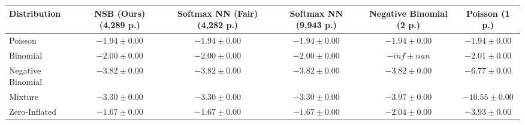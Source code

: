\begin{tabular}{lccccc}
\toprule
Distribution & NSB (Ours) (4,289 p.) & Softmax NN (Fair) (4,282 p.) & Softmax NN (9,943 p.) & Negative Binomial (2 p.) & Poisson (1 p.) \\
\midrule
Poisson & $-1.94 \pm 0.00$ & $-1.94 \pm 0.00$ & $-1.94 \pm 0.00$ & \textbf{$-1.94 \pm 0.00$} & $-1.94 \pm 0.00$ \\
Binomial & \textbf{$-2.00 \pm 0.00$} & $-2.00 \pm 0.00$ & $-2.00 \pm 0.00$ & $-inf \pm nan$ & $-2.01 \pm 0.00$ \\
Negative Binomial & $-3.82 \pm 0.00$ & $-3.82 \pm 0.00$ & $-3.82 \pm 0.00$ & \textbf{$-3.82 \pm 0.00$} & $-6.77 \pm 0.00$ \\
Mixture & $-3.30 \pm 0.00$ & \textbf{$-3.30 \pm 0.00$} & $-3.30 \pm 0.00$ & $-3.97 \pm 0.00$ & $-10.55 \pm 0.00$ \\
Zero-Inflated & $-1.67 \pm 0.00$ & \textbf{$-1.67 \pm 0.00$} & $-1.67 \pm 0.00$ & $-2.04 \pm 0.00$ & $-3.93 \pm 0.00$ \\
\bottomrule
\end{tabular}